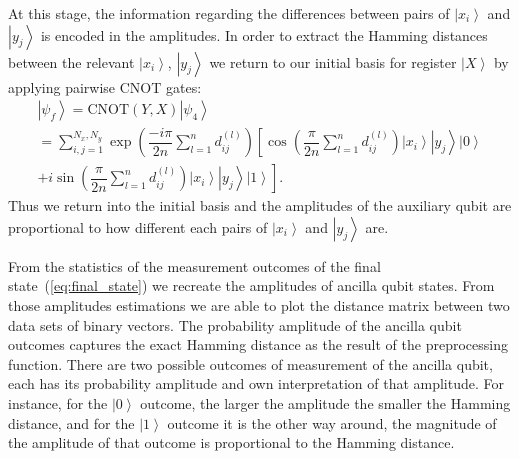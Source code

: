 \documentclass[pra,showkeys,twocolumn,showpacs,aps,10pt]{revtex4-1}
\begin{document}
At this stage, the information regarding the differences between pairs of $\left| x_i \right\rangle$ and $\left| y_j \right\rangle$ is encoded in the amplitudes. In order to extract the Hamming distances between the relevant $\left| x_i \right\rangle$, $\left| y_j \right\rangle$ we return to our initial basis for register $\left| X \right\rangle$ by applying pairwise CNOT gates:
%
\begin{multline}
    \label{eq:final_state}
    \left| \psi_f \right\rangle =
    \mathrm{CNOT} (Y,X)\left| \psi_4 \right\rangle \\=
    \sum\limits_{i, j=1}^{N_x,N_y}
    \exp \left(\dfrac{-i \pi}{2n}\sum\limits_{l=1}^n d^{(l)}_{ij} \right)
        \left[ \cos\left(\dfrac{\pi}{2n}\sum\limits_{l=1}^n d^{(l)}_{ij} \right)
        \left| x_i \right\rangle
        \left| y_j \right\rangle
        \left| 0 \right\rangle\right.
        \\+
        \left. i \sin\left(\dfrac{\pi}{2n}\sum\limits_{l=1}^n d^{(l)}_{ij} \right)
        \left| x_i \right\rangle
        \left| y_j \right\rangle
        \left| 1 \right\rangle\right] .
\end{multline}
%
Thus we return into the initial basis and the amplitudes of the auxiliary qubit are proportional to how different each pairs of $\left| x_i \right\rangle$ and $\left| y_j \right\rangle$ are.





From the statistics of the measurement outcomes of the final state~(\ref{eq:final_state}) we recreate the amplitudes of ancilla qubit states.
From those amplitudes estimations we are able to plot the distance matrix between two data sets of binary vectors.
The probability amplitude of the ancilla qubit outcomes captures the exact Hamming distance as the result of the preprocessing function.
There are two possible outcomes of measurement of the ancilla qubit, each has its probability amplitude and own interpretation of that amplitude.
For instance, for the $\left| 0 \right\rangle$ outcome, the larger the amplitude the smaller the Hamming distance,
and for the $\left| 1 \right\rangle$ outcome it is the other way around, the magnitude of the amplitude of that outcome is proportional to the Hamming distance.
\end{document}
